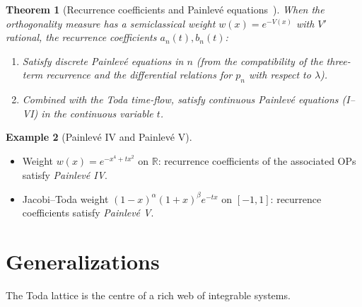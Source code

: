 \documentclass[12pt,a4paper]{article}
\newtheorem{theorem}{Theorem}[section]
\theoremstyle{definition}
\newtheorem{example}[theorem]{Example}
\newcommand{\R}{\mathbb{R}}
\begin{document}
\begin{theorem}[Recurrence coefficients and Painlev\'e
  equations~\cite{Zhedanov2022}]
When the orthogonality measure has a \emph{semiclassical weight}
$w(x)=e^{-V(x)}$ with $V'$ rational, the recurrence coefficients
$a_n(t), b_n(t)$:
\begin{enumerate}[label=(\roman*)]
  \item Satisfy \emph{discrete Painlev\'e equations} in $n$ (from the
        compatibility of the three-term recurrence and the differential
        relations for $p_n$ with respect to $\lambda$).
  \item Combined with the Toda time-flow, satisfy \emph{continuous Painlev\'e
        equations} (I--VI) in the continuous variable $t$.
\end{enumerate}
\end{theorem}

\begin{example}[Painlev\'e IV and Painlev\'e V]
\begin{itemize}
  \item Weight $w(x)=e^{-x^4+tx^2}$ on $\R$: recurrence coefficients of
        the associated OPs satisfy \emph{Painlev\'e IV}.
  \item Jacobi--Toda weight $(1-x)^\alpha(1+x)^\beta e^{-tx}$ on $[-1,1]$:
        recurrence coefficients satisfy \emph{Painlev\'e V}.
\end{itemize}
\end{example}

\section{Generalizations}

The Toda lattice is the centre of a rich web of integrable systems.
\end{document}
